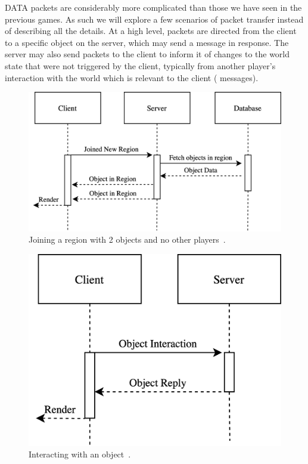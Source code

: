 DATA packets are considerably more complicated than those we have seen in the previous games. As such we will explore a few scenarios of packet transfer instead of describing all the details. At a high level, packets are directed from the client to a specific object on the server, which may send a message in response. The server may also send packets to the client to inform it of changes to the world state that were not triggered by the client, typically from another player's interaction with the world which is relevant to the client (\eg{} messages).

\begin{figure}[ht]
  \includegraphics[width=\columnwidth]{figures/join_region}
  \caption{Joining a region with 2 objects and no other players~\cite{habitatsrc}.}
  \Description[]{}
\end{figure}

\begin{figure}[h]
  \includegraphics[width=0.66\columnwidth]{figures/interact}
  \caption{Interacting with an object~\cite{habitatsrc}.}
  \Description[]{}
\end{figure}

